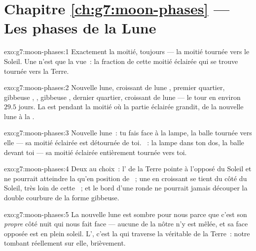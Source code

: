 \section*{Chapitre \ref{ch:g7:moon-phases} --- Les phases de la Lune}

\begin{solution}{exo:g7:moon-phases:1}
Exactement la moitié, toujours --- la moitié tournée vers le Soleil.
Une  n'est que la vue~: la fraction de cette moitié éclairée qui
se trouve tournée vers la Terre.
\end{solution}

\begin{solution}{exo:g7:moon-phases:2}
Nouvelle lune, croissant de lune , premier quartier,
gibbeuse , , gibbeuse , dernier
quartier, croissant de lune  --- le tour en environ
$29.5$ jours. La  est  pendant la moitié où la partie
éclairée grandit, de la nouvelle lune à la .
\end{solution}

\begin{solution}{exo:g7:moon-phases:3}
Nouvelle lune~: tu fais face à la lampe, la balle tournée vers
elle --- sa moitié éclairée est détournée de toi. ~: la
lampe dans ton dos, la balle devant toi --- sa moitié éclairée
entièrement tournée vers toi.
\end{solution}

\begin{solution}{exo:g7:moon-phases:4}
Deux au choix~: l' de la Terre pointe à l'opposé du Soleil et ne
pourrait atteindre la  qu'en position de ~; une 
en croissant se tient du côté du Soleil, très loin de cette ~; et
le bord d'une  ronde ne pourrait jamais découper la double
courbure de la forme gibbeuse.
\end{solution}

\begin{solution}{exo:g7:moon-phases:5}
La nouvelle lune est sombre pour nous parce que c'est son
\emph{propre} côté nuit qui nous fait face --- aucune  de la
nôtre n'y est mêlée, et sa face opposée est en plein soleil.
L', c'est la  qui traverse la véritable
 de la Terre~: notre  tombant réellement sur elle,
brièvement.
\end{solution}

